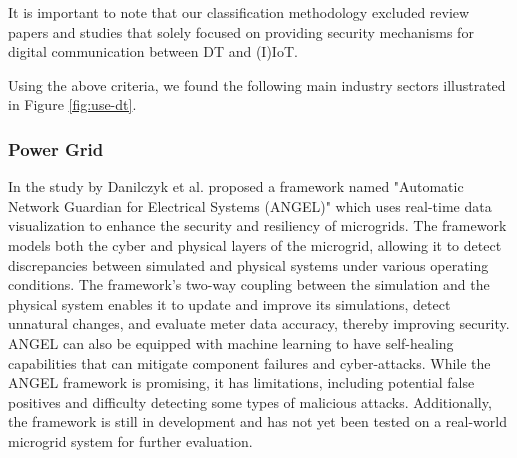 It is important to note that our classification methodology excluded review papers and studies that solely focused on providing security mechanisms for digital communication between DT and (I)IoT. 



Using the above criteria, we found the following main industry sectors illustrated in Figure \ref{fig:use-dt}. \\

\begin{center}
 

\label{fig:use-dt}
\end{center}
\subsubsection{Power Grid}
In the study by Danilczyk et al.\cite{williamdanilczykANGELIntelligentDigital2019} proposed a framework named "Automatic Network Guardian for Electrical Systems (ANGEL)" which uses real-time data visualization to enhance the security and resiliency of microgrids. The framework models both the cyber and physical layers of the microgrid, allowing it to detect discrepancies between simulated and physical systems under various operating conditions. The framework's two-way coupling between the simulation and the physical system enables it to update and improve its simulations, detect unnatural changes, and evaluate meter data accuracy, thereby improving security. ANGEL can also be equipped with machine learning to have self-healing capabilities that can mitigate component failures and cyber-attacks. While the ANGEL framework is promising, it has limitations, including potential false positives and difficulty detecting some types of malicious attacks. Additionally, the framework is still in development and has not yet been tested on a real-world microgrid system for further evaluation.

